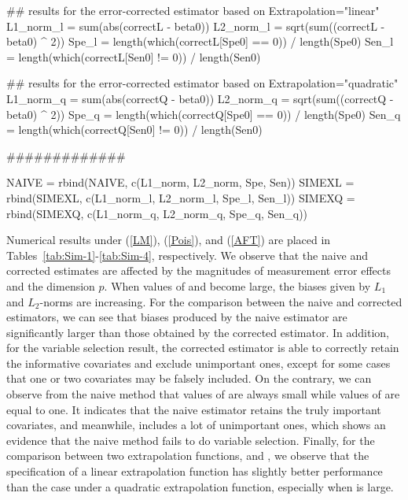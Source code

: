 \begin{example}
{{    ## results for the error-corrected estimator based on Extrapolation="linear"
    L1_norm_l = sum(abs(correctL - beta0))
    L2_norm_l = sqrt(sum((correctL - beta0) ^ 2))
    Spe_l = length(which(correctL[Spe0] == 0)) / length(Spe0)
    Sen_l = length(which(correctL[Sen0] != 0)) / length(Sen0)
    
    ## results for the error-corrected estimator based on Extrapolation="quadratic"
    L1_norm_q = sum(abs(correctQ - beta0))
    L2_norm_q = sqrt(sum((correctQ - beta0) ^ 2))
    Spe_q = length(which(correctQ[Spe0] == 0)) / length(Spe0)
    Sen_q = length(which(correctQ[Sen0] != 0)) / length(Sen0)
    
    
    #############
    
    NAIVE = rbind(NAIVE, c(L1_norm, L2_norm, Spe, Sen))
    SIMEXL = rbind(SIMEXL, c(L1_norm_l, L2_norm_l, Spe_l, Sen_l))
    SIMEXQ = rbind(SIMEXQ, c(L1_norm_q, L2_norm_q, Spe_q, Sen_q))
  }
}
\end{example}


Numerical results under (\ref{LM}),  (\ref{Pois}), and (\ref{AFT}) are placed in Tables~\ref{tab:Sim-1}-\ref{tab:Sim-4}, respectively.  We observe that the naive and corrected {estimates} are affected by the magnitudes of measurement error effects and the dimension $p$. When values of  and  become large, the biases given by $L_1$ and $L_2$-norms are increasing. For the comparison between the naive and corrected estimators, we can see that biases produced by the naive estimator are significantly larger than those obtained by the corrected estimator. In addition, for the variable selection result, the corrected estimator is able to correctly retain the informative covariates and exclude unimportant ones, except for some cases that one or two covariates may be falsely included. On the contrary, we can observe from the naive method that values of  are always small while values of  are equal to one. It indicates that the naive estimator retains the truly important covariates, and meanwhile, includes a lot of unimportant ones, which shows an evidence that the naive method fails to do variable selection. Finally, for the comparison between two extrapolation functions,  and , we observe that the specification of a linear extrapolation function has slightly better performance than the case under a quadratic extrapolation function, especially when  is large. %

